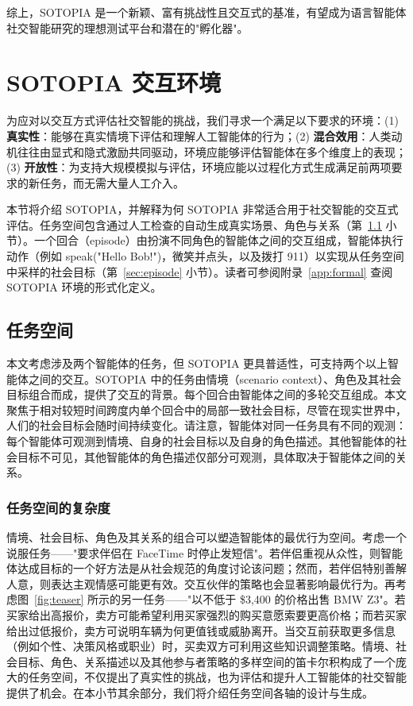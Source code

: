 \documentclass[11pt,a4paper]{article}
\begin{document}
综上，SOTOPIA 是一个新颖、富有挑战性且交互式的基准，有望成为语言智能体社交智能研究的理想测试平台和潜在的"孵化器"。

\section{SOTOPIA 交互环境}
\label{sec:env}

为应对以交互方式评估社交智能的挑战，我们寻求一个满足以下要求的环境：(1) \textbf{真实性}：能够在真实情境下评估和理解人工智能体的行为；(2) \textbf{混合效用}：人类动机往往由显式和隐式激励共同驱动，环境应能够评估智能体在多个维度上的表现；(3) \textbf{开放性}：为支持大规模模拟与评估，环境应能以过程化方式生成满足前两项要求的新任务，而无需大量人工介入。

本节将介绍 SOTOPIA，并解释为何 SOTOPIA 非常适合用于社交智能的交互式评估。任务空间包含通过人工检查的自动生成真实场景、角色与关系（第~\ref{sec:taskspace} 小节）。一个回合（episode）由扮演不同角色的智能体之间的交互组成，智能体执行动作（例如 speak("Hello Bob!")，微笑并点头，以及拨打 911）以实现从任务空间中采样的社会目标（第~\ref{sec:episode} 小节）。读者可参阅附录~\ref{app:formal} 查阅 SOTOPIA 环境的形式化定义。

\subsection{任务空间}
\label{sec:taskspace}

本文考虑涉及两个智能体的任务，但 SOTOPIA 更具普适性，可支持两个以上智能体之间的交互。SOTOPIA 中的任务由情境（scenario context）、角色及其社会目标组合而成，提供了交互的背景。每个回合由智能体之间的多轮交互组成。本文聚焦于相对较短时间跨度内单个回合中的局部一致社会目标，尽管在现实世界中，人们的社会目标会随时间持续变化。请注意，智能体对同一任务具有不同的观测：每个智能体可观测到情境、自身的社会目标以及自身的角色描述。其他智能体的社会目标不可见，其他智能体的角色描述仅部分可观测，具体取决于智能体之间的关系。

\subsubsection{任务空间的复杂度}

情境、社会目标、角色及其关系的组合可以塑造智能体的最优行为空间。考虑一个说服任务——"要求伴侣在 FaceTime 时停止发短信"。若伴侣重视从众性，则智能体达成目标的一个好方法是从社会规范的角度讨论该问题；然而，若伴侣特别善解人意，则表达主观情感可能更有效。交互伙伴的策略也会显著影响最优行为。再考虑图~\ref{fig:teaser} 所示的另一任务——"以不低于 \$3,400 的价格出售 BMW Z3"。若买家给出高报价，卖方可能希望利用买家强烈的购买意愿索要更高价格；而若买家给出过低报价，卖方可说明车辆为何更值钱或威胁离开。当交互前获取更多信息（例如个性、决策风格或职业）时，买卖双方可利用这些知识调整策略。情境、社会目标、角色、关系描述以及其他参与者策略的多样空间的笛卡尔积构成了一个庞大的任务空间，不仅提出了真实性的挑战，也为评估和提升人工智能体的社交智能提供了机会。在本小节其余部分，我们将介绍任务空间各轴的设计与生成。
\end{document}
